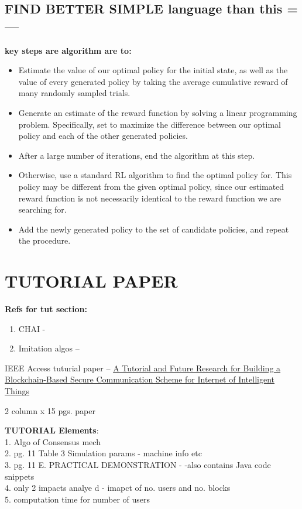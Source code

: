 \documentclass{article}
\begin{document}
\subsection{FIND BETTER SIMPLE language than this =--- }

\textbf{key steps are algorithm are to:}
\begin{itemize}
	\item Estimate the value of our optimal policy for the initial state, as well as the value of every generated policy 	by taking the average cumulative reward of many randomly sampled trials.
	
	\item Generate an estimate of the reward function by solving a linear programming problem. Specifically, set to maximize the difference between our optimal policy and each of the other generated policies.
	
	\item After a large number of iterations, end the algorithm at this step.
	
	\item Otherwise, use a standard RL algorithm to find the optimal policy for. This policy may be different from the given optimal policy, since our estimated reward function is not necessarily identical to the reward function we are searching for.
	
	\item Add the newly generated policy to the set of candidate policies, and repeat the procedure.
\end{itemize}


\section{TUTORIAL PAPER}\label{sec:Tutorial}

\textbf{Refs for tut section:}
\begin{enumerate}
	\item CHAI - \cite{CHAI}
	\item Imitation algos -- \cite{imitation-algos}
\end{enumerate}
\par

IEEE Access tuturial paper -- \href{https://ieeexplore.ieee.org/document/9086464}{A Tutorial and Future Research for Building a Blockchain-Based Secure Communication Scheme for Internet of Intelligent Things} 

2 column x 15 pgs. paper

\textbf{TUTORIAL Elements}:\\
1. Algo of Consensus mech\\
2. pg. 11 Table 3 Simulation params - machine info etc\\
3. pg. 11 E. PRACTICAL DEMONSTRATION - -also contains Java code snippets\\
4. only 2 impacts analye d - imapct of no. users and no. blocks \\
5. computation time for number of users\\
\end{document}
